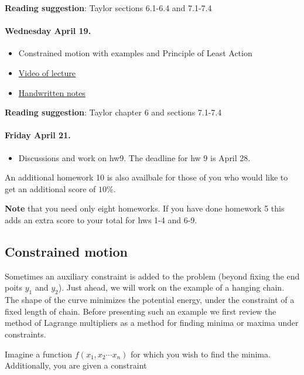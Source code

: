 \documentclass[%
oneside,                 %
final,                   %
10pt]{article}
\begin{document}
\noindent
\textbf{Reading suggestion}: Taylor sections 6.1-6.4 and 7.1-7.4

\paragraph{Wednesday April 19.}
\begin{itemize}
\item Constrained motion with examples and Principle of Least Action

\item \href{{https://youtu.be/}}{Video of lecture}

\item \href{{https://github.com/mhjensen/Physics321/blob/master/doc/HandWrittenNotes/Spring2023/NotesApril19.pdf}}{Handwritten notes}
\end{itemize}

\noindent
\textbf{Reading suggestion}: Taylor chapter 6 and sections 7.1-7.4

\paragraph{Friday April 21.}
\begin{itemize}
\item Discussions and work on hw9. The deadline for hw 9 is April 28.
\end{itemize}

\noindent
An additional homework 10 is also availbale for those of you who would like to get an additional score of $10\%$. 

\textbf{Note} that you need only eight homeworks. If you have done homework 5 this adds an extra score to your total for hws 1-4 and 6-9.

\subsection{Constrained motion}

Sometimes an auxiliary constraint is added to the problem (beyond
fixing the end poits $y_1$ and $y_2$). Just ahead, we will work on the
example of a hanging chain. The shape of the curve minimizes the
potential energy, under the constraint of a fixed length of
chain. Before presenting such an example we first review the method of
Lagrange multipliers as a method for finding minima or maxima under
constraints.

Imagine a function $f(x_1,x_2\cdots x_n)$ for which you wish to find
the minima. Additionally, you are given a constraint
\end{document}

